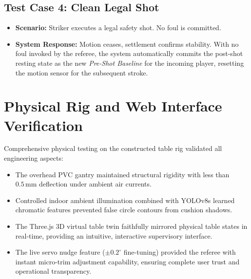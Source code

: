 \subsection{Test Case 4: Clean Legal Shot}
\begin{itemize}
    \item \textbf{Scenario:} Striker executes a legal safety shot. No foul is committed.
    \item \textbf{System Response:} Motion ceases, settlement confirms stability. With no foul invoked by the referee, the system automatically commits the post-shot resting state as the new \textit{Pre-Shot Baseline} for the incoming player, resetting the motion sensor for the subsequent stroke.
\end{itemize}

\section{Physical Rig and Web Interface Verification}
Comprehensive physical testing on the constructed table rig validated all engineering aspects:
\begin{itemize}
    \item The overhead PVC gantry maintained structural rigidity with less than $0.5\,\text{mm}$ deflection under ambient air currents.
    \item Controlled indoor ambient illumination combined with YOLOv8s learned chromatic features prevented false circle contours from cushion shadows.
    \item The Three.js 3D virtual table twin faithfully mirrored physical table states in real-time, providing an intuitive, interactive supervisory interface.
    \item The live servo nudge feature ($\pm 0.2^\circ$ fine-tuning) provided the referee with instant micro-trim adjustment capability, ensuring complete user trust and operational transparency.
\end{itemize}
